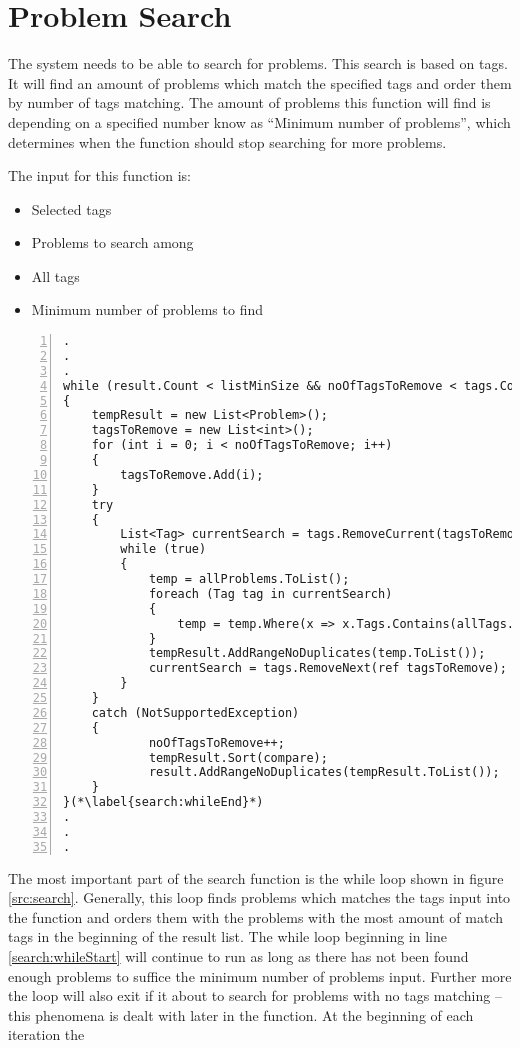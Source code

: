 \section{Problem Search}
The system needs to be able to search for problems.
This search is based on tags.
It will find an amount of problems which match the specified tags and order them by number of tags matching.
The amount of problems this function will find is depending on a specified number know as ``Minimum number of problems'', which determines when the function should stop searching for more problems.

The input for this function is:

\begin{itemize}
	\item Selected tags
	\item Problems to search among
	\item All tags
	\item Minimum number of problems to find
\end{itemize}

\begin{lstlisting}[style=sourceCode, caption=\myCaption{The while loop which finds and sorts problems matching the input tags}, label=src:search, numbers=left, numberstyle=\footnotesize]
.
.
.
while (result.Count < listMinSize && noOfTagsToRemove < tags.Count)(*\label{search:whileStart}*)
{
	tempResult = new List<Problem>();
	tagsToRemove = new List<int>();
	for (int i = 0; i < noOfTagsToRemove; i++)
	{
		tagsToRemove.Add(i);
	}
	try
	{
		List<Tag> currentSearch = tags.RemoveCurrent(tagsToRemove);
		while (true)
		{
			temp = allProblems.ToList();
			foreach (Tag tag in currentSearch)
			{
				temp = temp.Where(x => x.Tags.Contains(allTags.FirstOrDefault(y => y.Id == tag.Id))).ToList();
			}
			tempResult.AddRangeNoDuplicates(temp.ToList());
			currentSearch = tags.RemoveNext(ref tagsToRemove);
		}
	}
	catch (NotSupportedException)
	{
			noOfTagsToRemove++;
			tempResult.Sort(compare);
			result.AddRangeNoDuplicates(tempResult.ToList());
	}
}(*\label{search:whileEnd}*)
.
.
.
\end{lstlisting}

The most important part of the search function is the while loop shown in figure \ref{src:search}.
Generally, this loop finds problems which matches the tags input into the function and orders them with the problems with the most amount of match tags in the beginning of the result list.
The while loop beginning in line \ref{search:whileStart} will continue to run as long as there has not been found enough problems to suffice the minimum number of problems input.
Further more the loop will also exit if it about to search for problems with no tags matching -- this phenomena is dealt with later in the function.
At the beginning  of each iteration the 